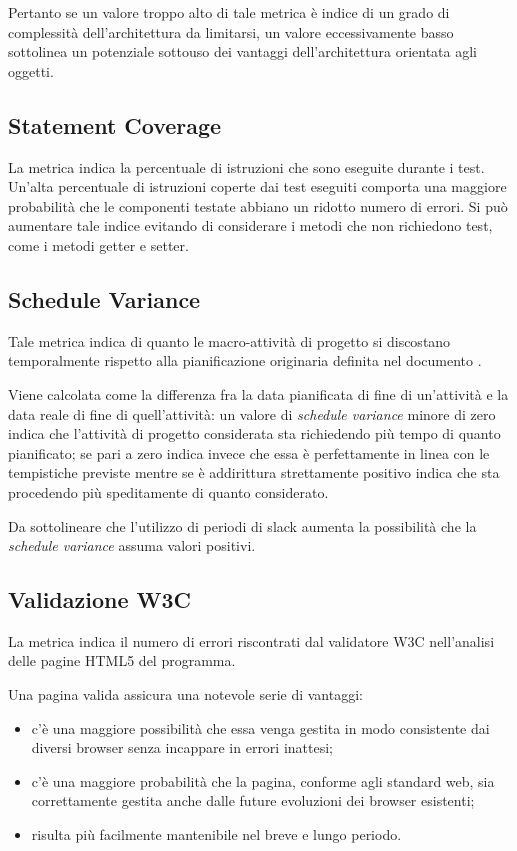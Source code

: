 Pertanto se un valore troppo alto di tale metrica è indice di un grado di complessità dell'architettura da limitarsi, un valore eccessivamente basso sottolinea un potenziale sottouso dei vantaggi dell'architettura orientata agli oggetti.

\subsection{Statement Coverage}
La metrica indica la percentuale di istruzioni che sono eseguite durante i test. Un'alta percentuale di istruzioni coperte dai test eseguiti comporta una maggiore probabilità che le componenti testate abbiano un ridotto numero di errori. Si può aumentare tale indice evitando di considerare i metodi che non richiedono test, come i metodi getter e setter.

\subsection{Schedule Variance}
Tale metrica indica di quanto le macro-attività di progetto si discostano temporalmente rispetto alla pianificazione originaria definita nel documento \PdP . 

Viene calcolata come la differenza fra la data pianificata di fine di un'attività e la data reale di fine di quell'attività: un valore di \emph{schedule variance} minore di zero indica che l'attività di progetto considerata sta richiedendo più tempo di quanto pianificato; se pari a zero indica invece che essa è perfettamente in linea con le tempistiche previste mentre se è addirittura strettamente positivo indica che sta procedendo più speditamente di quanto considerato. 

Da sottolineare che l'utilizzo di periodi di slack aumenta la possibilità che la \emph{schedule variance} assuma valori positivi.

\subsection{Validazione W3C}
La metrica indica il numero di errori riscontrati dal validatore W3C nell'analisi delle pagine HTML5 del programma.

Una pagina valida assicura una notevole serie di vantaggi:
\begin{itemize}
 	\item c'è una maggiore possibilità che essa venga gestita in modo consistente dai diversi browser senza incappare in errori inattesi;
 	\item c'è una maggiore probabilità che la pagina, conforme agli standard web, sia correttamente gestita anche dalle future evoluzioni dei browser esistenti;
 	\item risulta più facilmente mantenibile nel breve e lungo periodo.
\end{itemize}



